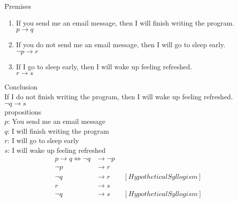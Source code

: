 \documentclass[a4paper, 12pt]{article}
\newenvironment{example}[1][Example]{\begin{trivlist}
\item[\hskip \labelsep {\bfseries #1}]}{\end{trivlist}}
\newcommand{\then}{\rightarrow}
\begin{document}
    \begin{example}
        Premises
        \begin{enumerate}
            \item If you send me an email message, then I will finish writing the program. \\
            $p \then q$
            \item If you do not send me an email message, then I will go to sleep early. \\
            $\neg p \then r$
            \item If I go to sleep early, then I will wake up feeling refreshed. \\
            $r \then s$
        \end{enumerate}
        Conclusion \\
        If I do not finish writing the program, then I will wake up feeling refreshed.\\
        $\neg q \then s$\\
        \newline
        propositions \\
        $p$: You send me an email message \\
        $q$: I will finish writing the program \\
        $r$: I will go to sleep early \\
        $s$: I will wake up feeling refreshed \\
        \begin{align}
            p \then q \iff \neg q &\then \neg p \\
            \neg p &\then r \\
            \neg q &\then r \quad \quad [Hypothetical Syllogism] \\
            r &\then s \\
            \neg q &\then s \quad \quad [Hypothetical Syllogism]
        \end{align}
    \end{example}
\end{document}
